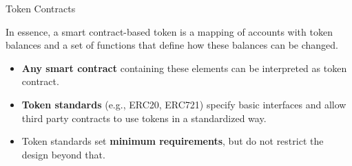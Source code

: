 \documentclass[handout]{beamer}
\begin{document}
\begin{frame}{Token Contracts}

\begin{minipage}{0.35\textwidth}
	\begin{tikzpicture}[scale=1.0, every node/.style={scale=1.0}]
			
	\end{tikzpicture}
\end{minipage}
\begin{minipage}{0.6\textwidth}
			In essence, a smart contract-based token is \color{focus}a mapping \color{black}of accounts with token balances and a \color{focus} set of functions \color{black} that define how these balances can be changed.  
\end{minipage}

\vspace{2 em}

\begin{itemize}
	\item<2-> \textbf{Any smart contract} containing these elements can be interpreted as token contract.
	\item<3-> \textbf{Token standards} (e.g., ERC20, ERC721) specify basic interfaces and allow third party contracts to use tokens in a standardized way.
\item<4-> Token standards set \textbf{minimum requirements}, but do not restrict the design beyond that. 
\end{itemize}	
	

\end{frame}
\end{document}
